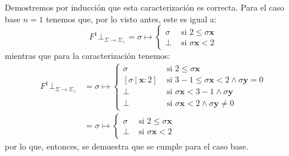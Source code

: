 \documentclass{article}
\newcommand{\x}{\textbf{x}}
\newcommand{\y}{\textbf{y}}
\newcommand{\cdom}{\Sigma \to \Sigma_\bot}
\newcommand{\cfbot}{\bot_{\cdom}}
\begin{document}
Demostremos por inducción que esta caracterización es correcta.
Para el caso base $n = 1$ tenemos que, por lo visto antes, este es igual a:
\begin{equation*}
  F^1 \cfbot = \sigma \mapsto \begin{cases}
    \sigma &\text{ si } 2 \leq \sigma\x \\ 
    \bot &\text{ si } \sigma\x < 2
  \end{cases}
\end{equation*}
mientras que para la caracterización tenemos:
\begin{equation*}
  \begin{aligned}
    F^1 \cfbot &= \sigma \mapsto \begin{cases}
      \sigma &\text{ si } 2 \leq \sigma\x \\ 
      [\sigma\ |\ \x : 2] &\text{ si } 3-1 \leq \sigma\x < 2 \land \sigma\y = 0 \\ 
      \bot &\text{ si } \sigma\x < 3-1 \land \sigma\y \\ 
      \bot &\text{ si } \sigma\x < 2 \land \sigma\y \neq 0 
    \end{cases} \\ 
               &= \sigma \mapsto \begin{cases}
                 \sigma &\text{ si } 2 \leq \sigma\x \\ 
                 \bot &\text{ si } \sigma\x < 2 
               \end{cases}
  \end{aligned}
\end{equation*}
por lo que, entonces, se demuestra que se cumple para el caso base.
\end{document}
